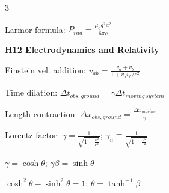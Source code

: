 \documentclass[a4paper,twoside]{article}
\newcommand{\secblock}[1]{%
\par\vspace{1.8pt}%
\noindent\colorbox{hdrcol}{\parbox[c][1.0em][c]{0.98\linewidth}{\color{white}\bfseries\small #1}}\par
\vspace{1pt}%
}
\begin{document}
\begin{multicols*}{3}













Larmor formula:
\(P_{rad} = \frac{\mu_0 q^2 a^2}{6 \pi c}\)

\secblock{H12 Electrodynamics and Relativity}

Einstein vel. addition:
\(v_{ab} = \frac{v_a + v_b}{1 + v_a v_b/c^2}\)

Time dilation:
\(\Delta t_{obs, ground} = \gamma \Delta t_{moving\,system}\)

Length contraction:
\(\Delta x_{obs, ground} = \frac{\Delta x_{moving}}{\gamma}\)

Lorentz factor:
\(\gamma = \frac{1}{\sqrt{1 - \frac{v^2}{c^2}}}\);
\(\gamma_u \equiv \frac{1}{\sqrt{1 - \frac{u^2}{c^2}}}\)

\(\gamma = \cosh\theta\); \(\gamma\beta = \sinh\theta\)

\(\cosh^2\theta - \sinh^2\theta = 1\); \(\theta = \tanh^{-1} \beta\)



\end{multicols*}
\end{document}
